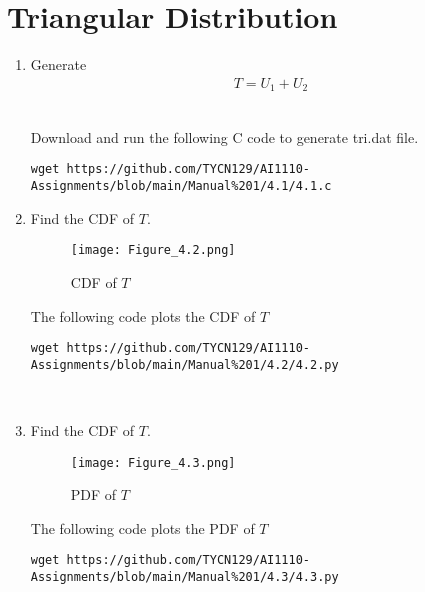 \documentclass[journal,12pt,twocolumn]{IEEEtran}
\renewcommand\thesection{\arabic{section}}
\begin{document}
\section{Triangular Distribution}
\begin{enumerate}[label=\thesection.\arabic*
,ref=\thesection.\theenumi]
    \item Generate
    \begin{align}
        T = U_1 + U_2
    \end{align}

\solution\\
Download and run the following C code to generate tri.dat file.
\begin{lstlisting}
wget https://github.com/TYCN129/AI1110-Assignments/blob/main/Manual%201/4.1/4.1.c
\end{lstlisting}
\item Find the CDF of $T$.\\
\solution
\begin{figure}[h!]
    \centering
    \texttt{[image: Figure\_4.2.png]}
    \caption{CDF of $T$}
    \label{fig:my_label}
\end{figure}
\clearpage
The following code plots the CDF of $T$
\begin{lstlisting}
wget https://github.com/TYCN129/AI1110-Assignments/blob/main/Manual%201/4.2/4.2.py
\end{lstlisting}
\\
\item Find the CDF of $T$.\\
\solution
\begin{figure}[H]
    \centering
    \texttt{[image: Figure\_4.3.png]}
    \caption{PDF of $T$}
    \label{fig:my_label}
\end{figure}
The following code plots the PDF of $T$
\begin{lstlisting}
wget https://github.com/TYCN129/AI1110-Assignments/blob/main/Manual%201/4.3/4.3.py
\end{lstlisting}


\end{enumerate}
\end{document}
